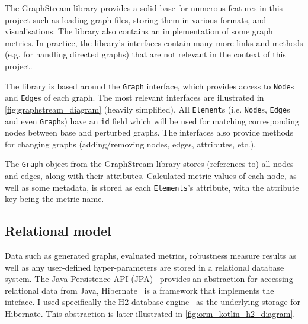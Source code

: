 The GraphStream library provides a solid base for numerous features in this project such as loading graph files, storing them in various formats, and visualisations.
The library also contains an implementation of some graph metrics.
In practice, the library's interfaces contain many more links and methods (e.g. for handling directed graphs) that are not relevant in the context of this project.



The library is based around the \texttt{Graph} interface, which provides access to \texttt{Node}s and \texttt{Edge}s of each graph.
The most relevant interfaces are illustrated in \autoref{fig:graphstream_diagram} (heavily simplified).
All \texttt{Element}s (i.e. \texttt{Node}s, \texttt{Edge}s and even \texttt{Graph}s) have an \texttt{id} field which will be used for matching corresponding nodes between base and perturbed graphs.
The interfaces also provide methods for changing graphs (adding/removing nodes, edges, attributes, etc.).

The \texttt{Graph} object from the GraphStream library stores (references to) all nodes and edges, along with their attributes.
Calculated metric values of each node, as well as some metadata, is stored as each \texttt{Elements}'s attribute, with the attribute key being the metric name.

\subsection{Relational model}

Data such as generated graphs, evaluated metrics, robustness measure results as well as any user-defined hyper-parameters are stored in a relational database system.
The Java Persistence API (JPA)~\cite{BiswasJavaPersistenceAPI2016} provides an abstraction for accessing relational data from Java, Hibernate~\cite{ElliottHibernateDeveloperNotebook2004,BauerJavaPersistenceHibernate2015} is a framework that implements the inteface.
I used specifically the H2 database engine~\cite{MuellerH2DatabaseEngine2006} as the underlying storage for Hibernate.
This abstraction is later illustrated in \autoref{fig:orm_kotlin_h2_diagram}.



